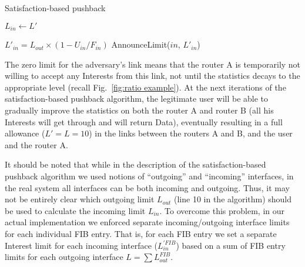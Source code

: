 { 
\begin{algorithm}[h]
\footnotesize
\caption{\small Satisfaction-based pushback}
\label{alg:dynamic limits}
\begin{algorithmic}[1]
\State{} 
\vspace{0.1cm}
  

\vspace{0.1cm}

\State{} 
    \State $L_{in} \leftarrow L'$
\EndFunction

\vspace{0.1cm}

 

        \State $L'_{in}= {L_{out}} \times (1 - U_{in}/F_{in})$
        \State AnnounceLimit($in$, $L'_{in}$)
   \EndFor

\EndFor
\EndFunction

\end{algorithmic}
\end{algorithm}


The zero limit for the adversary's link means that the router A is temporarily not willing to accept any Interests from this link, not until the statistics decays to the appropriate level (recall Fig.~\ref{fig:ratio example}).
At the next iterations of the satisfaction-based pushback algorithm, the legitimate user will be able to gradually improve the statistics on both the router A and router B (all his Interests will get through and will return Data), eventually resulting in a full allowance ($L'=L=10$) in the links between the routers A and B, and the user and the router A.

It should be noted that while in the description of the satisfaction-based pushback algorithm we used notions of ``outgoing'' and ``incoming'' interfaces, in the real system all interfaces can be both incoming and outgoing.
Thus, it may not be entirely clear which outgoing limit $L_{out}$ (line 10 in the algorithm) should be used to calculate the incoming limit $L_{in}$.
To overcome this problem, in our actual implementation we enforced separate incoming/outgoing interface limits for each individual FIB entry.
That is, for each FIB entry we set a separate Interest limit for each incoming interface ($L_{in}^{'FIB}$) based on a sum of FIB entry limits for each outgoing interface $L=\sum{L_{out}^{FIB}}$.


}
